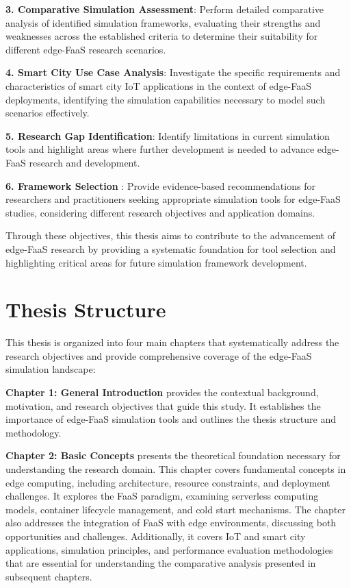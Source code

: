 \textbf{3. Comparative Simulation Assessment}: Perform detailed comparative analysis of identified simulation frameworks, evaluating their strengths and weaknesses across the established criteria to determine their suitability for different edge-FaaS research scenarios.

\textbf{4. Smart City Use Case Analysis}: Investigate the specific requirements and characteristics of smart city IoT applications in the context of edge-FaaS deployments, identifying the simulation capabilities necessary to model such scenarios effectively.

\textbf{5. Research Gap Identification}: Identify limitations in current simulation tools and highlight areas where further development is needed to advance edge-FaaS research and development.

\textbf{6. Framework Selection }: Provide evidence-based recommendations for researchers and practitioners seeking appropriate simulation tools for edge-FaaS studies, considering different research objectives and application domains.

Through these objectives, this thesis aims to contribute to the advancement of edge-FaaS research by providing a systematic foundation for tool selection and highlighting critical areas for future simulation framework development.

\section{Thesis Structure}

This thesis is organized into four main chapters that systematically address the research objectives and provide comprehensive coverage of the edge-FaaS simulation landscape:

\textbf{Chapter 1: General Introduction} provides the contextual background, motivation, and research objectives that guide this study. It establishes the importance of edge-FaaS simulation tools and outlines the thesis structure and methodology.

\textbf{Chapter 2: Basic Concepts} presents the theoretical foundation necessary for understanding the research domain. This chapter covers fundamental concepts in edge computing, including architecture, resource constraints, and deployment challenges. It explores the FaaS paradigm, examining serverless computing models, container lifecycle management, and cold start mechanisms. The chapter also addresses the integration of FaaS with edge environments, discussing both opportunities and challenges. Additionally, it covers IoT and smart city applications, simulation principles, and performance evaluation methodologies that are essential for understanding the comparative analysis presented in subsequent chapters.

